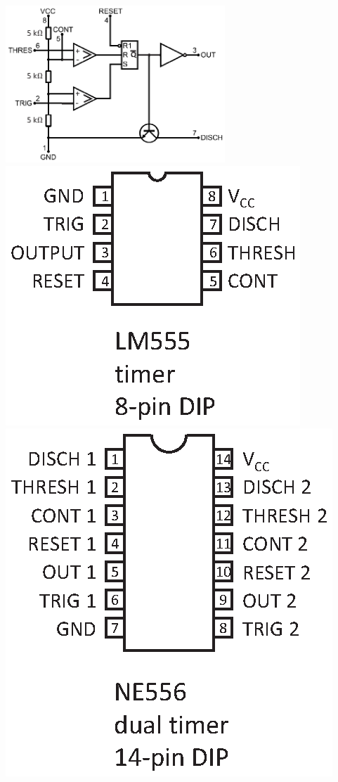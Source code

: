 \hspace{0.25in}
\includegraphics[width=3.25in]{timers/555_block_diagram.eps}
\hspace{-0.3in}\includegraphics[scale=0.75]{appendices/pinouts/lm555_simple.eps}
\hspace{-0.2in}\includegraphics[scale=0.75]{appendices/pinouts/ne556_abrev.eps}

